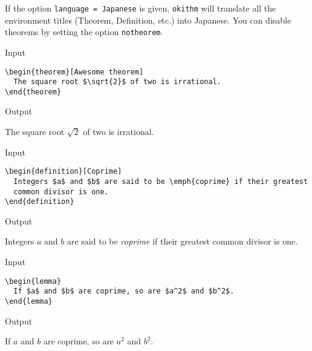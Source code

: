 \documentclass[a4paper, 11pt]{article}
\begin{document}
If the option \texttt{language = Japanese} is given, \texttt{okithm} will translate all the environment titles (Theorem, Definition, etc.) into Japanese.
You can disable theorems by setting the option \texttt{notheorem}.

\begin{itembox}[l]{Input}
  \begin{verbatim}
\begin{theorem}[Awesome theorem]
  The square root $\sqrt{2}$ of two is irrational.
\end{theorem}
\end{verbatim}
\end{itembox}

\begin{itembox}[l]{Output}
  \begin{theorem}
    The square root $\sqrt{2}$ of two is irrational.
  \end{theorem}
\end{itembox}

\begin{itembox}[l]{Input}
  \begin{verbatim}
\begin{definition}[Coprime]
  Integers $a$ and $b$ are said to be \emph{coprime} if their greatest
  common divisor is one.
\end{definition}
\end{verbatim}
\end{itembox}

\begin{itembox}[l]{Output}
  \begin{definition}[Coprime]
    Integers $a$ and $b$ are said to be \emph{coprime} if their greatest
    common divisor is one.
  \end{definition}
\end{itembox}

\begin{itembox}[l]{Input}
  \begin{verbatim}
\begin{lemma}
  If $a$ and $b$ are coprime, so are $a^2$ and $b^2$.
\end{lemma}
\end{verbatim}
\end{itembox}

\begin{itembox}[l]{Output}
  \begin{lemma}
    If $a$ and $b$ are coprime, so are $a^2$ and $b^2$.
  \end{lemma}
\end{itembox}
\end{document}
